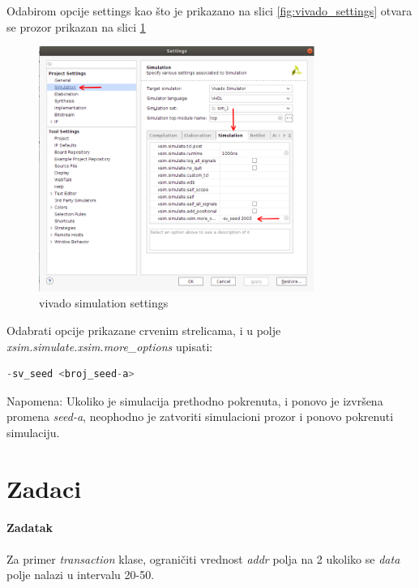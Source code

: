 Odabirom opcije settings kao što je prikazano na slici \ref{fig:vivado_settings} otvara se
prozor prikazan na slici \ref{fig:vivado_simulation_settings}

\begin{figure}[h!]
  \center
  \includegraphics[width=90mm, scale=0.5]{img/v4_vivado_simulation_settings.png}
  \caption{vivado simulation settings}
  \label{fig:vivado_simulation_settings}
\end{figure}

Odabrati opcije prikazane crvenim strelicama,
i u polje \emph{xsim.simulate.xsim.more\_options} upisati:

\begin{lstlisting}[language=Python]
-sv_seed <broj_seed-a> 
\end{lstlisting}
Napomena: Ukoliko je simulacija prethodno pokrenuta, i  ponovo je izvršena promena \emph{seed-a}, neophodno je
zatvoriti simulacioni prozor i ponovo pokrenuti simulaciju.





\section{Zadaci}

\paragraph{Zadatak}

Za primer \emph{transaction} klase, ograničiti vrednost \emph{addr} polja na 2
ukoliko se \emph{data} polje nalazi u intervalu 20-50.

